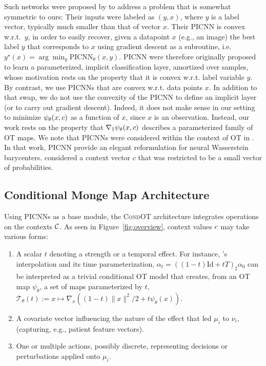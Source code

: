 Such networks were proposed by \citet[Eq. 3]{amos2017input} to address a problem that is somewhat symmetric to ours: Their inputs were labeled as $(y, x)$, where $y$ is a label vector, typically much smaller than that of vector $x$. Their PICNN is convex w.r.t.~$y$, in order to easily recover, given a datapoint $x$ (e.g., an image) the best label $y$ that corresponds to $x$ using gradient descent as a subroutine, i.e. $y^\star(x) = \arg\min_y \text{PICNN}_\theta(x,y)$. PICNN were therefore originally proposed to learn a parameterized, implicit classification layer, amortized over samples, whose motivation rests on the property that it is convex w.r.t. label variable $y$. By contrast, we use PICNNs that are convex w.r.t. data points $x$. In addition to that swap, we do not use the convexity of the PICNN to define an implicit layer (or to carry out gradient descent). Indeed, it does not make sense in our setting to minimize $\psi_\theta(x,c)$ as a function of $x$, since $x$ is an observation. Instead, our work rests on the property that $\nabla_1 \psi_\theta(x,c)$ describes a parameterized family of OT maps. We note that PICNNs were considered within the context of OT in \cite[Appendix B]{fan2021scalable}. In that work, PICNN provide an elegant reformulation for neural Wasserstein barycenters. \citet{fan2021scalable} considered a context vector $c$ that was restricted to be a small vector of probabilities.


\subsection{Conditional Monge Map Architecture}\label{subsec:combin}
Using PICNNs as a base module, the \textsc{CondOT} architecture integrates operations on the contexts ${\mathcal{C}}$. As seen in Figure~\ref{fig:overview}, context values $c$ may take various forms:
\begin{enumerate}[noitemsep,leftmargin=.35cm,topsep=0pt,parsep=0pt,partopsep=0pt]
\item A scalar $t$ denoting a strength or a temporal effect. For instance, \citeauthor{mccann1997convexity}'s interpolation and its time parameterization, $\alpha_{t}=((1-t) \text{Id}+t T)_{\sharp} \alpha_{0}$ \citep{mccann1997convexity} can be interpreted as a trivial conditional OT model that creates, from an OT map $\psi_\theta$, a set of maps parameterized by $t$, $\mathcal{T}_\theta(t):=x\mapsto\nabla_x \left((1-t)\|x\|^2/2 +t \psi_\theta(x)\right)$.
\item A covariate vector influencing the nature of the effect that led $\mu_i$ to $\nu_i$, (capturing, e.g., patient feature vectors).
\item One or multiple actions, possibly discrete, representing decisions or perturbations applied onto $\mu_i$.
\end{enumerate}

